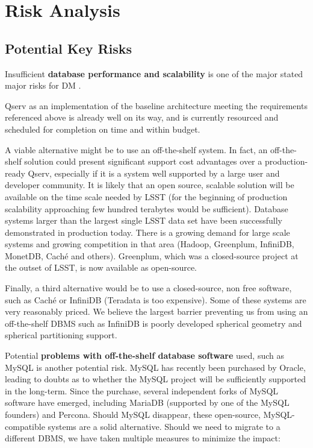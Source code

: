 \documentclass[DM,toc]{lsstdoc}
\begin{document}
\section{Risk Analysis}\label{risk-analysis}

\subsection{Potential Key Risks}\label{potential-key-risks}

Insufficient \textbf{database performance and scalability} is one of the
major stated major risks for DM .

Qserv as an implementation of the baseline architecture meeting the
requirements referenced above is already well on its way, and is currently
resourced and scheduled for completion on time and within budget.

A viable alternative might be to use an off-the-shelf system. In fact, an off-the-shelf
solution could present significant support cost advantages over a
production-ready Qserv, especially if it is a system well supported by a large
user and developer community. It is likely that an open source, scalable
solution will be available on the time scale needed by LSST (for the beginning
of production scalability approaching few hundred terabytes would be
sufficient). Database systems larger than the largest single LSST data set
have been successfully demonstrated in production today.  There is a growing
demand for large scale systems and growing competition in that area (Hadoop,
Greenplum, InfiniDB, MonetDB, Caché and others).  Greenplum, which was a
closed-source project at the outset of LSST, is now available as open-source.

Finally, a third alternative would be to use a closed-source, non free
software, such as Caché or InfiniDB (Teradata is too expensive). Some of these
systems are very reasonably priced. We believe the largest barrier preventing
us from using an off-the-shelf DBMS such as InfiniDB is poorly developed
spherical geometry and spherical partitioning support.

Potential \textbf{problems with off-the-shelf database software} used,
such as MySQL is another potential risk. MySQL has recently been
purchased by Oracle, leading to doubts as to whether the MySQL project
will be sufficiently supported in the long-term. Since the purchase,
several independent forks of MySQL software have emerged, including
MariaDB (supported by one of the MySQL founders) and Percona. Should MySQL disappear, these open-source,
MySQL-compatible systems are a solid alternative. Should we need to
migrate to a different DBMS, we have taken multiple measures to minimize
the impact:
\end{document}
